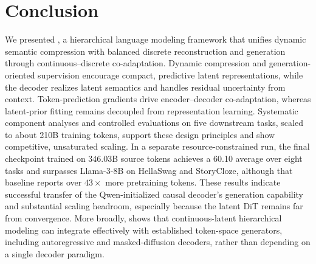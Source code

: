 \section{Conclusion}
\label{sec:conclusion}

We presented \method, a hierarchical language modeling framework that unifies dynamic semantic compression with balanced discrete reconstruction and generation through continuous--discrete co-adaptation. Dynamic compression and generation-oriented supervision encourage compact, predictive latent representations, while the decoder realizes latent semantics and handles residual uncertainty from context. Token-prediction gradients drive encoder--decoder co-adaptation, whereas latent-prior fitting remains decoupled from representation learning. Systematic component analyses and controlled evaluations on five downstream tasks, scaled to about 210B training tokens, support these design principles and show competitive, unsaturated scaling. In a separate resource-constrained run, the final checkpoint trained on 346.03B source tokens achieves a 60.10 average over eight tasks and surpasses Llama-3-8B on HellaSwag and StoryCloze, although that baseline reports over $43{\times}$ more pretraining tokens. These results indicate successful transfer of the Qwen-initialized causal decoder's generation capability and substantial scaling headroom, especially because the latent DiT remains far from convergence. More broadly, \method shows that continuous-latent hierarchical modeling can integrate effectively with established token-space generators, including autoregressive and masked-diffusion decoders, rather than depending on a single decoder paradigm.
